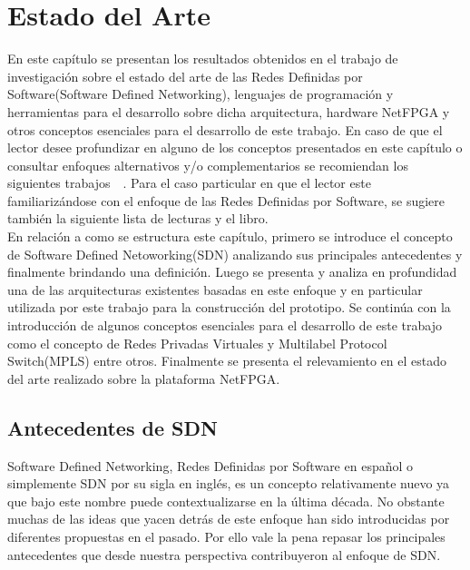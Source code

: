 
\chapter{Estado del Arte}  %

\ifpdf
    \graphicspath{{Chapter2/Figs/Raster/}{Chapter2/Figs/PDF/}{Chapter2/Figs/}}
\else
    \graphicspath{{Chapter2/Figs/Vector/}{Chapter2/Figs/}}
\fi

En este capítulo se presentan los resultados obtenidos en el trabajo de investigación sobre el estado
del arte de las Redes Definidas por Software(Software Defined Networking), lenguajes
de programación y herramientas para el desarrollo sobre dicha arquitectura, hardware NetFPGA y otros conceptos esenciales para el desarrollo de este trabajo. En caso de que el lector desee profundizar en alguno de los conceptos presentados en este cap\'itulo o consultar enfoques alternativos
y/o complementarios se recomiendan los siguientes trabajos~\citep{StateOfArt1}~\citep{StateOfArt2}. Para el caso particular en que el lector este familiarizándose con el enfoque de las Redes Definidas por Software, se sugiere también la siguiente lista de lecturas\citep{SDNReadingList} y el libro\citep{SDNBook1}.\\

En relación a como se estructura este cap\'itulo, primero se introduce el concepto de Software Defined Netoworking(SDN) analizando sus principales antecedentes y finalmente brindando una definición. Luego se presenta y analiza en profundidad una de las arquitecturas existentes basadas en este enfoque y en particular utilizada por este trabajo para la construcción del prototipo. Se contin\'ua con la introducción de algunos conceptos esenciales para el desarrollo de este trabajo como el concepto de Redes Privadas Virtuales y Multilabel Protocol Switch(MPLS) entre otros. Finalmente se presenta el relevamiento en el estado del arte realizado sobre la plataforma NetFPGA.  

\section{Antecedentes de SDN} %
Software Defined Networking, Redes Definidas por Software en español o simplemente SDN por su sigla en ingl\'es, es un concepto relativamente nuevo ya que bajo este nombre puede contextualizarse en la \'ultima década. No obstante muchas de las ideas que yacen detrás de este enfoque han sido introducidas por diferentes propuestas en el pasado. Por ello vale la pena repasar los principales antecedentes que desde nuestra perspectiva contribuyeron al enfoque de SDN. 

